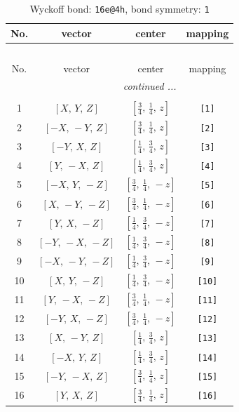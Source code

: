 \documentclass[fleqn,8pt]{jsarticle}
\begin{document}
\begin{longtable}{cccc}
\caption{Wyckoff bond: {\tt 16e@4h}, bond symmetry: {\tt 1}}
 \\
 \hline \hline
No. & vector & center & mapping \\ \hline \endfirsthead

\multicolumn{3}{l}{\tablename\ \thetable{}} \\
 \hline \hline
No. & vector & center & mapping \\ \hline \endhead

 \hline \hline
\multicolumn{3}{r}{\footnotesize\it continued ...} \\ \endfoot

 \hline \hline
\multicolumn{3}{r}{} \\ \endlastfoot

1 & $\left[ X,\, Y,\, Z \right]$ & $\left[ \frac{3}{4},\, \frac{1}{4},\, z \right]$ & {\tt [1]} \\ \hline
2 & $\left[ - X,\, - Y,\, Z \right]$ & $\left[ \frac{3}{4},\, \frac{1}{4},\, z \right]$ & {\tt [2]} \\ \hline
3 & $\left[ - Y,\, X,\, Z \right]$ & $\left[ \frac{1}{4},\, \frac{3}{4},\, z \right]$ & {\tt [3]} \\ \hline
4 & $\left[ Y,\, - X,\, Z \right]$ & $\left[ \frac{1}{4},\, \frac{3}{4},\, z \right]$ & {\tt [4]} \\ \hline
5 & $\left[ - X,\, Y,\, - Z \right]$ & $\left[ \frac{3}{4},\, \frac{1}{4},\, - z \right]$ & {\tt [5]} \\ \hline
6 & $\left[ X,\, - Y,\, - Z \right]$ & $\left[ \frac{3}{4},\, \frac{1}{4},\, - z \right]$ & {\tt [6]} \\ \hline
7 & $\left[ Y,\, X,\, - Z \right]$ & $\left[ \frac{1}{4},\, \frac{3}{4},\, - z \right]$ & {\tt [7]} \\ \hline
8 & $\left[ - Y,\, - X,\, - Z \right]$ & $\left[ \frac{1}{4},\, \frac{3}{4},\, - z \right]$ & {\tt [8]} \\ \hline
9 & $\left[ - X,\, - Y,\, - Z \right]$ & $\left[ \frac{1}{4},\, \frac{3}{4},\, - z \right]$ & {\tt [9]} \\ \hline
10 & $\left[ X,\, Y,\, - Z \right]$ & $\left[ \frac{1}{4},\, \frac{3}{4},\, - z \right]$ & {\tt [10]} \\ \hline
11 & $\left[ Y,\, - X,\, - Z \right]$ & $\left[ \frac{3}{4},\, \frac{1}{4},\, - z \right]$ & {\tt [11]} \\ \hline
12 & $\left[ - Y,\, X,\, - Z \right]$ & $\left[ \frac{3}{4},\, \frac{1}{4},\, - z \right]$ & {\tt [12]} \\ \hline
13 & $\left[ X,\, - Y,\, Z \right]$ & $\left[ \frac{1}{4},\, \frac{3}{4},\, z \right]$ & {\tt [13]} \\ \hline
14 & $\left[ - X,\, Y,\, Z \right]$ & $\left[ \frac{1}{4},\, \frac{3}{4},\, z \right]$ & {\tt [14]} \\ \hline
15 & $\left[ - Y,\, - X,\, Z \right]$ & $\left[ \frac{3}{4},\, \frac{1}{4},\, z \right]$ & {\tt [15]} \\ \hline
16 & $\left[ Y,\, X,\, Z \right]$ & $\left[ \frac{3}{4},\, \frac{1}{4},\, z \right]$ & {\tt [16]} \\
\end{longtable}
\end{document}
